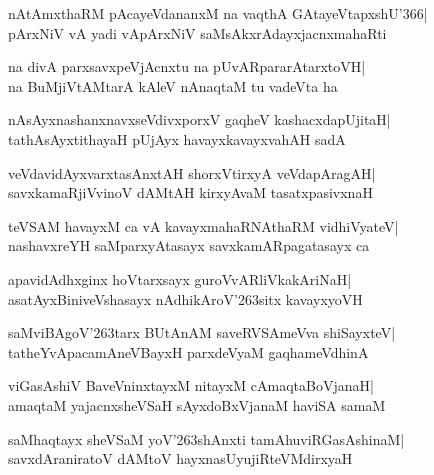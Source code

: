 \documentclass[twoside,12pt,openright]{book}
\def\S{\char'263}
\newcounter{shloka}[chapter]
\begin{document}
\begin{shloka}%
nAtAmxthaRM pAcayeVdananxM na vaqthA GAtayeVtapxshU\char'366|\\
pArxNiV vA yadi vApArxNiV saMsAkxrAdayxjacnxmahaRti
\end{shloka}

\begin{shloka}%
na divA parxsavxpeVjAcnxtu na pUvARpararAtarxtoVH|\\
na BuMjiVtAMtarA kAleV nAnaqtaM tu vadeVta ha
\end{shloka}

\begin{shloka}%
nAsAyxnashanxnavxseVdivxporxV gaqheV kashacxdapUjitaH|\\
tathAsAyxtithayaH pUjAyx havayxkavayxvahAH sadA
\end{shloka}

\begin{shloka}%
veVdavidAyxvarxtasAnxtAH shorxVtirxyA veVdapAragAH|\\
savxkamaRjiVvinoV dAMtAH kirxyAvaM tasatxpasivxnaH
\end{shloka}

\begin{shloka}%
teVSAM havayxM ca vA kavayxmahaRNAthaRM vidhiVyateV|\\
nashavxreYH saMparxyAtasayx savxkamARpagatasayx ca
\end{shloka}

\begin{shloka}%
apavidAdhxginx hoVtarxsayx guroVvARliVkakAriNaH|\\
asatAyxBiniveVshasayx nAdhikAroV\S sitx kavayxyoVH
\end{shloka}

\begin{shloka}%
saMviBAgoV\S tarx BUtAnAM saveRVSAmeVva shiSayxteV|\\
tatheYvApacamAneVBayxH parxdeVyaM gaqhameVdhinA
\end{shloka}

\begin{shloka}%
viGasAshiV BaveVninxtayxM nitayxM cAmaqtaBoVjanaH|\\
amaqtaM yajacnxsheVSaH sAyxdoBxVjanaM haviSA samaM
\end{shloka}

\begin{shloka}%
saMhaqtayx sheVSaM yoV\S shAnxti tamAhuviRGasAshinaM|\\
savxdAraniratoV dAMtoV hayxnasUyujiRteVMdirxyaH
\end{shloka}
\end{document}
